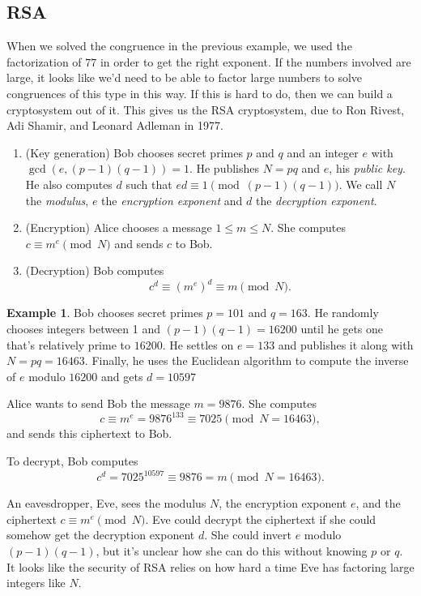 \documentclass[12pt]{article}
\theoremstyle{plain}
\theoremstyle{definition}
\newtheorem{example}[theorem]{Example}
\theoremstyle{remark}
\begin{document}
\subsection{RSA}

When we solved the congruence in the previous example, we used the factorization of $77$ in order to get the right exponent.
If the numbers involved are large, it looks like we'd need to be able to factor large numbers to solve congruences of this type in this way.
If this is hard to do, then we can build a cryptosystem out of it.
This gives us the RSA cryptosystem, due to Ron Rivest, Adi Shamir, and Leonard Adleman in 1977.
\begin{enumerate}
    \item (Key generation) Bob chooses secret primes $p$ and $q$ and an integer $e$ with $\gcd(e, (p-1)(q-1)) = 1$.
    He publishes $N = pq$ and $e$, his \emph{public key}.
    He also computes $d$ such that $ed \equiv 1\pmod{(p-1)(q-1)}$.
    We call $N$ the \emph{modulus}, $e$ the \emph{encryption exponent} and $d$ the \emph{decryption exponent}.

    \item (Encryption) Alice chooses a message $1\leq m\leq N$.
    She computes $c\equiv m^e\pmod N$ and sends $c$ to Bob.

    \item (Decryption) Bob computes
    \[
        c^d \equiv (m^e)^d \equiv m \pmod N.
    \]
\end{enumerate}

\begin{example}
    Bob chooses secret primes $p=101$ and $q = 163$.
    He randomly chooses integers between 1 and $(p-1)(q-1) = 16200$ until he gets one that's relatively prime to $16200$.
    He settles on $e = 133$ and publishes it along with $N = pq = 16463$.
    Finally, he uses the Euclidean algorithm to compute the inverse of $e$ modulo $16200$ and gets $d = 10597$

    Alice wants to send Bob the message $m = 9876$.
    She computes
    \[
        c \equiv m^e = 9876^{133} \equiv 7025\pmod{N = 16463},
    \]
    and sends this ciphertext to Bob.

    To decrypt, Bob computes
    \[
        c^d = 7025^{10597} \equiv 9876 = m\pmod{N = 16463}.
    \]
\end{example}

An eavesdropper, Eve, sees the modulus $N$, the encryption exponent $e$, and the ciphertext $c \equiv m^e\pmod N$.
Eve could decrypt the ciphertext if she could somehow get the decryption exponent $d$.
She could invert $e$ modulo $(p-1)(q-1)$, but it's unclear how she can do this without knowing $p$ or $q$.
It looks like the security of RSA relies on how hard a time Eve has factoring large integers like $N$.
\end{document}
